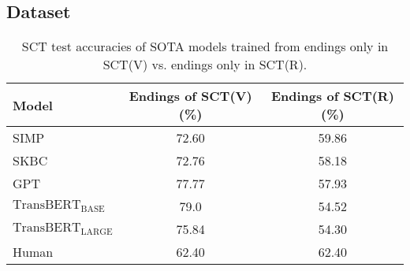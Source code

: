 
\subsection{Dataset}
\label{sec:dataset}

\begin{table}[th]
\small
\centering
\begin{tabular}{lcc}
\hline
\textbf{Model}& Endings of SCT(V) (\%) & Endings of SCT(R) (\%)\\
\hline
SIMP& 72.60 &59.86\\
SKBC&72.76&58.18\\
GPT& 77.77 &57.93\\
$\text{TransBERT}_\text{BASE}$&79.0&54.52\\
$\text{TransBERT}_\text{LARGE}$&75.84&54.30\\
\hline
Human& 62.40&62.40\\
\hline
\end{tabular}
\caption{SCT test accuracies of SOTA models trained from endings only in SCT(V) vs. 
endings only in SCT(R).}
\label{tab:end}
\end{table}


